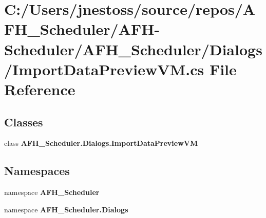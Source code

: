 \section{C\+:/\+Users/jnestoss/source/repos/\+A\+F\+H\+\_\+\+Scheduler/\+A\+F\+H-\/\+Scheduler/\+A\+F\+H\+\_\+\+Scheduler/\+Dialogs/\+Import\+Data\+Preview\+VM.cs File Reference}
\label{_import_data_preview_v_m_8cs}
\subsection*{Classes}
\begin{DoxyCompactItemize}
\item 
class \textbf{ A\+F\+H\+\_\+\+Scheduler.\+Dialogs.\+Import\+Data\+Preview\+VM}
\end{DoxyCompactItemize}
\subsection*{Namespaces}
\begin{DoxyCompactItemize}
\item 
namespace \textbf{ A\+F\+H\+\_\+\+Scheduler}
\item 
namespace \textbf{ A\+F\+H\+\_\+\+Scheduler.\+Dialogs}
\end{DoxyCompactItemize}
